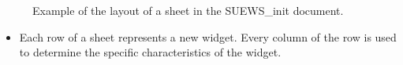 \documentclass[letterpaper,10pt,english]{sphinxmanual}
\begin{document}
\begin{itemize}
\begin{description}
\begin{figure}[htbp]
\centering
\capstart

\noindent{}
\caption{Example of the layout of a sheet in the SUEWS\_init document.}\label{\detokenize{DevelopmentGuidelines:id5}}\end{figure}
\begin{itemize}
\item {} 
Each row of a sheet represents a new widget. Every column of the row is used to determine the specific characteristics of the widget.

\end{itemize}

\end{description}

\end{itemize}
\end{document}
